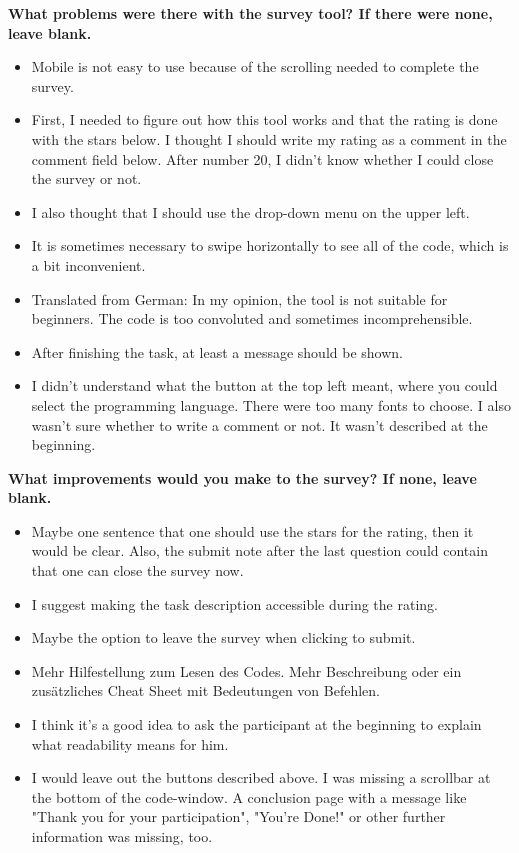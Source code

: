 \documentclass[%
class=scrreprt,
chapterprefix=false,%
open=right,%
twoside=true,%
paper=a4,%
logofile={Logo\_zentral\_farbig\_EN.png},%
thesistype=master,%
UKenglish,%
]{se2thesis}
\theoremstyle{definition}
\begin{document}
	\textbf{What problems were there with the survey tool? If there were none, leave blank.}
	\begin{itemize}
		\item Mobile is not easy to use because of the scrolling needed to complete the survey.
		\item First, I needed to figure out how this tool works and that the rating is done with the stars below. I thought I should write my rating as a comment in the comment field below. After number 20, I didn't know whether I could close the survey or not.
		\item I also thought that I should use the drop-down menu on the upper left.
		\item It is sometimes necessary to swipe horizontally to see all of the code, which is a bit inconvenient.
		\item Translated from German: In my opinion, the tool is not suitable for beginners. The code is too convoluted and sometimes incomprehensible.
		\item After finishing the task, at least a message should be shown.
		\item I didn't understand what the button at the top left meant, where you could select the programming language. There were too many fonts to choose. I also wasn't sure whether to write a comment or not. It wasn't described at the beginning.
	\end{itemize}

	\textbf{What improvements would you make to the survey? If none, leave blank.}
	\begin{itemize}
		\item Maybe one sentence that one should use the stars for the rating, then it would be clear. Also, the submit note after the last question could contain that one can close the survey now.
		\item I suggest making the task description accessible during the rating.
		\item Maybe the option to leave the survey when clicking to submit.
		\item Mehr Hilfestellung zum Lesen des Codes. Mehr Beschreibung oder ein zusätzliches Cheat Sheet mit Bedeutungen von Befehlen.
		\item I think it's a good idea to ask the participant at the beginning to explain what readability means for him.
		\item I would leave out the buttons described above. I was missing a scrollbar at the bottom of the code-window. A conclusion page with a message like "Thank you for your participation", "You're Done!" or other further information was missing, too.
	\end{itemize}
	
\end{document}
